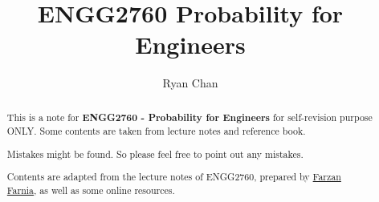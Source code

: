 \documentclass[a4paper]{report}
\author{Ryan Chan}
\title{ENGG2760 Probability for Engineers}
\begin{document}
\setlength\parindent{0pt}


\maketitle

\newpage

\begin{abstract}
	This is a note for \textbf{ENGG2760 - Probability for Engineers} for self-revision purpose ONLY. Some contents are taken from lecture notes and reference book. 
	
	Mistakes might be found. So please feel free to point out any mistakes.

	Contents are adapted from the lecture notes of ENGG2760, prepared by \href{https://www.cse.cuhk.edu.hk/~farnia/}{Farzan Farnia}, as well as some online resources.
\end{abstract}

\newpage

\tableofcontents

\setlength{\parskip}{5pt}
\end{document}
